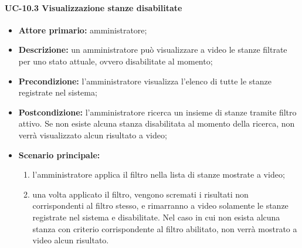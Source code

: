 \paragraph{UC-10.3 Visualizzazione stanze disabilitate}
\begin{itemize}
    \item \textbf{Attore primario:} amministratore;
    \item \textbf{Descrizione:} un amministratore pu\`{o} visualizzare a video le stanze filtrate per uno stato attuale, ovvero disabilitate al momento;
    \item \textbf{Precondizione:} l'amministratore visualizza l'elenco di tutte le stanze registrate nel sistema;
    \item \textbf{Postcondizione:} l'amministratore ricerca un insieme di stanze tramite filtro attivo. Se non esiste alcuna stanza disabilitata al momento della ricerca, non verrà visualizzato alcun risultato a video;
    \item \textbf{Scenario principale:}
    \begin{enumerate}
        \item l'amministratore applica il filtro nella lista di stanze mostrate a video;
        \item una volta applicato il filtro, vengono scremati i risultati non corrispondenti al filtro stesso, e rimarranno a video solamente le stanze registrate nel sistema e disabilitate. Nel caso in cui non esista alcuna stanza con criterio corrispondente al filtro abilitato, non verrà mostrato a video alcun risultato.
    \end{enumerate}
\end{itemize}


